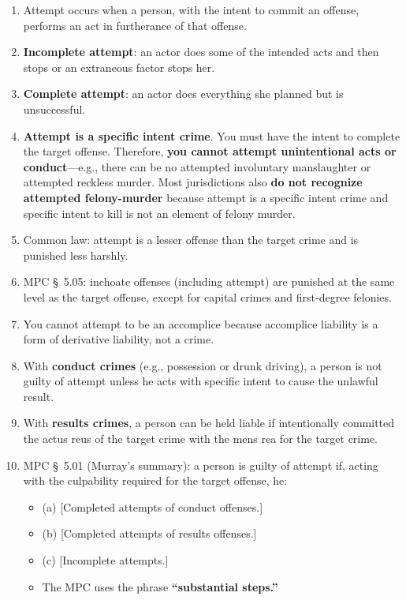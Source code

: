 \begin{enumerate}
    \item Attempt occurs when a person, with the intent to commit an offense, 
    performs an act in furtherance of that offense.
    \item \textbf{Incomplete attempt}: an actor does some of the intended acts 
    and then stops or an extraneous factor stops her.
    \item \textbf{Complete attempt}: an actor does everything she planned but 
    is unsuccessful.
    \item \textbf{Attempt is a specific intent crime}. You must have the 
    intent to complete the target offense. Therefore, \textbf{you cannot 
    attempt unintentional acts or conduct}---e.g., there can be no attempted 
    involuntary manslaughter or attempted reckless murder. Most jurisdictions 
    also \textbf{do not recognize attempted felony-murder} because attempt is 
    a specific intent crime and specific intent to kill is not an element of 
    felony murder.
    \item Common law: attempt is a lesser offense than the target crime and is 
    punished less harshly.
    \item MPC \S\ 5.05: inchoate offenses (including attempt) are punished at 
    the same level as the target offense, except for capital crimes and 
    first-degree felonies.
    \item You cannot attempt to be an accomplice because accomplice liability 
    is a form of derivative liability, not a crime.
    \item With \textbf{conduct crimes} (e.g., possession or drunk driving), a 
    person is not guilty of attempt unless he acts with specific intent to 
    cause the unlawful result.
    \item With \textbf{results crimes}, a person can be held liable if 
    intentionally committed the actus reus of the target crime with the mens 
    rea for the target crime. 
    \item MPC \S\ 5.01 (Murray's summary): a person is guilty of attempt if, 
    acting with the culpability required for the target offense, he:
    \begin{itemize}
        \item (a) [Completed attempts of conduct offenses.]
        \item (b) [Completed attempts of results offenses.]
        \item (c) [Incomplete attempts.]
        \item The MPC uses the phrase \textbf{``substantial steps.''}

\end{itemize}
\end{enumerate}
